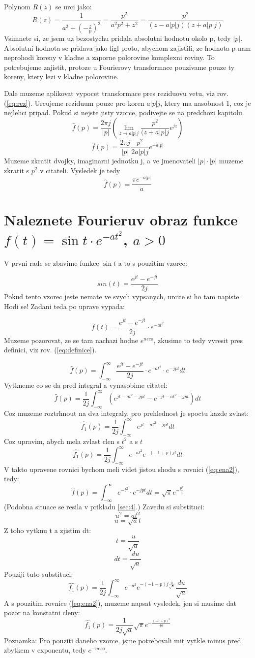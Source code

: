Polynom $R(z)$ se urci jako:
$$R(z)=\frac{1}{a^2+\left(-\frac{z}{p}\right)^2}=\frac{p^2}{a^2p^2+z^2}=\frac{p^2}{(z-a|p|j)(z+a|p|j)}$$
Vsimnete si, ze jsem uz bezostychu pridala absolutni hodnotu okolo p, tedy $|p|$. Absolutni hodnota se pridava jako figl proto, abychom zajistili, ze hodnota p nam neprohodi koreny v kladne a zaporne polorovine komplexni roviny. To potrebujeme zajistit, protoze u Fourierovy transformace pouzivame pouze ty koreny, ktery lezi v kladne polorovine.

Dale muzeme aplikovat vypocet transformace pres reziduovu vetu, viz rov. (\ref{eq:rez}). Urcujeme reziduum pouze pro koren $a|p|j$, ktery ma nasobnost 1, coz je nejlehci pripad. Pokud si nejste jisty vzorce, podivejte se na predchozi kapitolu.
$$\hat{f}(p)=\frac{2\pi j}{|p|}\left(\lim_{z \to a|p|j} \frac{p^2}{(z+a|p|j}e^{jz} \right)$$
$$\hat{f}(p)=\frac{2\pi j}{|p|}\frac{p^2}{2a|p|j}e^{-a|p|}$$
Muzeme zkratit dvojky, imaginarni jednotku j, a ve jmenovateli $|p|\cdot |p|$ muzeme zkratit s $p^2$ v citateli. Vysledek je tedy
$$\hat{f}(p)=\frac{\pi e^{-a|p|}}{a}$$

\newpage

\section{Naleznete Fourieruv obraz funkce $f(t)=\operatorname{sin}t \cdot e^{-at^2}$, $a>0$}

V prvni rade se zbavime funkce $\operatorname{sin}t$ a to s pouzitim vzorce:

$$sin(t)=\frac{e^{jt}-e^{-jt}}{2j}$$
Pokud tento vzorec jeste nemate ve svych vypsanych, urcite si ho tam napiste. Hodi se!
Zadani teda po uprave vypada:

$$f(t)=\frac{e^{jt}-e^{-jt}}{2j} \cdot e^{-at^2}$$
Muzeme pozorovat, ze se tam nachazi hodne $e^{neco}$, zkusime to tedy vyresit pres definici, viz rov. (\ref{eq:definice}).

$$\hat{f}(p)=\int_{-\infty}^{\infty} \frac{e^{jt}-e^{-jt}}{2j} \cdot e^{-at^2} \cdot e^{-jpt} dt$$
Vytkneme co se da pred integral a vynasobime citatel:
$$\hat{f}(p)=\frac{1}{2j}\int_{-\infty}^{\infty}\left( e^{jt-at^2-jpt} - e^{-jt-at^2-jpt} \right)dt$$
Coz muzeme roztrhnout na dva integraly, pro prehlednost je spoctu kazde zvlast:
$$\hat{f_1}(p)=\frac{1}{2j}\int_{-\infty}^{\infty} e^{jt-at^2-jpt} dt$$
Coz upravim, abych mela zvlast clen s $t^2$ a s $t$ 
$$\hat{f_1}(p)=\frac{1}{2j}\int_{-\infty}^{\infty} e^{-at^2} e^{-(-1+p)jt} dt$$
V takto upravene rovnici bychom meli videt jistou shodu s rovnici (\ref{eq:ena2}), tedy:
$$\hat{f}(p)=\int_{-\infty}^\infty e^{{-t}^2}\cdot e^{-jpt}dt = \sqrt{\pi}e^{-\frac{p^2}{4}}$$
(Podobna situace se resila v prikladu \ref{sec:4}.)
Zavedu si substituci:
$$u^2=at^2$$
$$u = \sqrt{a}t$$
Z toho vytknu t a zjistim dt:
$$t=\frac{u}{\sqrt{a}}$$
$$dt=\frac{du}{\sqrt{a}}$$
Pouziji tuto substituci:
$$\hat{f_1}(p)=\frac{1}{2j}\int_{-\infty}^{\infty}e^{-u^2}e^{-(-1+p)j\frac{u}{\sqrt{a}}}\frac{du}{\sqrt{a}}$$
A s pouzitim rovnice (\ref{eq:ena2}), muzeme napsat vysledek, jen si musime dat pozor na konstatni cleny:
$$\hat{f_1}(p)=\frac{1}{2j\sqrt{a}}\sqrt{\pi}e^{-\frac{(-1+p)^2}{4a}}$$
Poznamka: Pro pouziti daneho vzorce, jsme potrebovali mit vytkle minus pred zbytkem v exponentu, tedy $e^{-neco}$.

